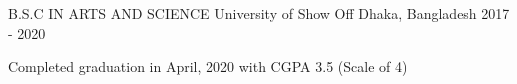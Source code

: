 \begin{cventries}
  \cventry
    {B.S.C IN ARTS AND SCIENCE}
    {University of Show Off}
    {Dhaka, Bangladesh}
    {2017 - 2020}
    {
      \vspace{-5mm}
      \begin{cvitems}
      \item {Completed graduation in April, 2020 with CGPA 3.5 (Scale of 4)}
      \end{cvitems}
  }
\end{cventries}

